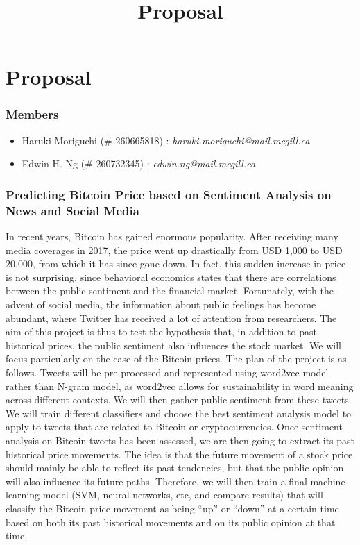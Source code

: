 \documentclass[12pt,a4paper]{report}
\begin{document}
\title{Proposal\\
}


\setcounter{page}{1}
\thispagestyle{empty} 


\chapter*{Proposal}
\subsection*{Members}
\begin{itemize}
\item Haruki Moriguchi (\# 260665818) : \textit{haruki.moriguchi@mail.mcgill.ca}
\item Edwin H. Ng (\# 260732345) : \textit{edwin.ng@mail.mcgill.ca}
\end{itemize}

\subsection*{Predicting Bitcoin Price based on Sentiment Analysis on News and Social Media}
\par \qquad In recent years, Bitcoin has gained enormous popularity. After receiving many media coverages in 2017, the price went up drastically from USD 1,000 to USD 20,000, from which it has since gone down. In fact, this sudden increase in price is not surprising, since behavioral economics states that there are correlations between the public sentiment and the financial market. Fortunately, with the advent of social media, the information about public feelings has become abundant, where Twitter has received a lot of attention from researchers. The aim of this project is thus to test the hypothesis that, in addition to past historical prices, the public sentiment also influences the stock market. We will focus particularly on the case of the Bitcoin prices. The plan of the project is as follows. Tweets will be pre-processed and represented using word2vec model rather than N-gram model, as word2vec allows for sustainability in word meaning across different contexts. We will then gather public sentiment from these tweets. We will train different classifiers and choose the best sentiment analysis model to apply to tweets that are related to Bitcoin or cryptocurrencies. Once sentiment analysis on Bitcoin tweets has been assessed, we are then going to extract its past historical price movements. The idea is that the future movement of a stock price should mainly be able to reflect its past tendencies, but that the public opinion will also influence its future paths. Therefore, we will then train a final machine learning model (SVM, neural networks, etc, and compare results) that will classify the Bitcoin price movement as being ``up'' or ``down'' at a certain time based on both its past historical movements and on its public opinion at that time.
\\
\end{document}
